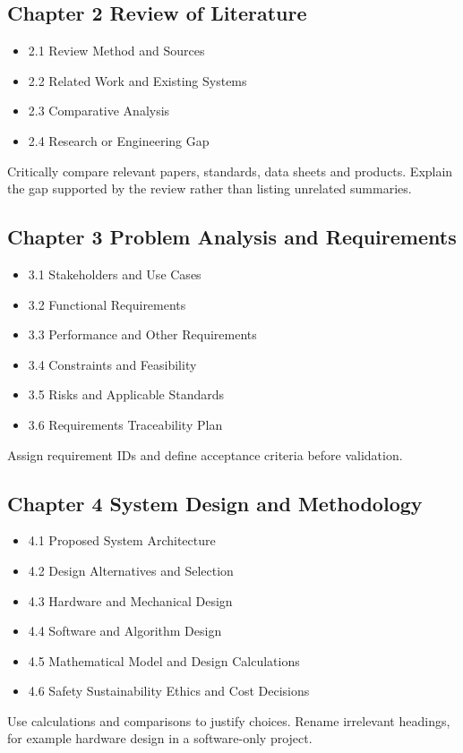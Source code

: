 \documentclass[11pt,a4paper]{article}
\begin{document}
\subsection*{Chapter 2 Review of Literature}
\begin{itemize}
\item 2.1 Review Method and Sources
\item 2.2 Related Work and Existing Systems
\item 2.3 Comparative Analysis
\item 2.4 Research or Engineering Gap
\end{itemize}
Critically compare relevant papers, standards, data sheets and products. Explain
the gap supported by the review rather than listing unrelated summaries.

\subsection*{Chapter 3 Problem Analysis and Requirements}
\begin{itemize}
\item 3.1 Stakeholders and Use Cases
\item 3.2 Functional Requirements
\item 3.3 Performance and Other Requirements
\item 3.4 Constraints and Feasibility
\item 3.5 Risks and Applicable Standards
\item 3.6 Requirements Traceability Plan
\end{itemize}
Assign requirement IDs and define acceptance criteria before validation.

\subsection*{Chapter 4 System Design and Methodology}
\begin{itemize}
\item 4.1 Proposed System Architecture
\item 4.2 Design Alternatives and Selection
\item 4.3 Hardware and Mechanical Design
\item 4.4 Software and Algorithm Design
\item 4.5 Mathematical Model and Design Calculations
\item 4.6 Safety Sustainability Ethics and Cost Decisions
\end{itemize}
Use calculations and comparisons to justify choices. Rename irrelevant headings,
for example hardware design in a software-only project.
\end{document}
